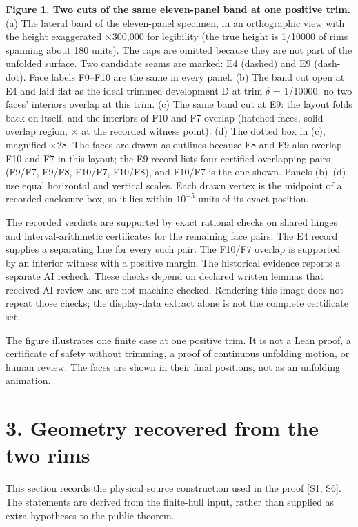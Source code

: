 \documentclass[
  11pt,
  letterpaper,
]{article}
\begin{document}
\textbf{Figure 1. Two cuts of the same eleven-panel band at one positive
trim.} (a) The lateral band of the eleven-panel specimen, in an
orthographic view with the height exaggerated ×300,000 for legibility
(the true height is 1/10000 of rims spanning about 180 units). The caps
are omitted because they are not part of the unfolded surface. Two
candidate seams are marked: E4 (dashed) and E9 (dash-dot). Face labels
F0--F10 are the same in every panel. (b) The band cut open at E4 and
laid flat as the ideal trimmed development D at trim \(\delta\) =
1/10000: no two faces' interiors overlap at this trim. (c) The same band
cut at E9: the layout folds back on itself, and the interiors of F10 and
F7 overlap (hatched faces, solid overlap region, × at the recorded
witness point). (d) The dotted box in (c), magnified ×28. The faces are
drawn as outlines because F8 and F9 also overlap F10 and F7 in this
layout; the E9 record lists four certified overlapping pairs (F9/F7,
F9/F8, F10/F7, F10/F8), and F10/F7 is the one shown. Panels (b)--(d) use
equal horizontal and vertical scales. Each drawn vertex is the midpoint
of a recorded enclosure box, so it lies within \(10^{-5}\) units of its
exact position.

The recorded verdicts are supported by exact rational checks on shared
hinges and interval-arithmetic certificates for the remaining face
pairs. The E4 record supplies a separating line for every such pair. The
F10/F7 overlap is supported by an interior witness with a positive
margin. The historical evidence reports a separate AI recheck. These
checks depend on declared written lemmas that received AI review and are
not machine-checked. Rendering this image does not repeat those checks;
the display-data extract alone is not the complete certificate set.

The figure illustrates one finite case at one positive trim. It is not a
Lean proof, a certificate of safety without trimming, a proof of
continuous unfolding motion, or human review. The faces are shown in
their final positions, not as an unfolding animation.

\section{3. Geometry recovered from the two
rims}\label{geometry-recovered-from-the-two-rims}

This section records the physical source construction used in the proof
{[}S1, S6{]}. The statements are derived from the finite-hull input,
rather than supplied as extra hypotheses to the public theorem.
\end{document}
